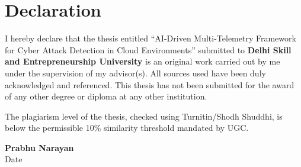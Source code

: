 \chapter*{Declaration}
I hereby declare that the thesis entitled ``AI-Driven Multi-Telemetry Framework for Cyber Attack Detection in Cloud Environments'' submitted to \textbf{Delhi Skill and Entrepreneurship University} is an original work carried out by me under the supervision of my advisor(s). All sources used have been duly acknowledged and referenced. This thesis has not been submitted for the award of any other degree or diploma at any other institution.

The plagiarism level of the thesis, checked using Turnitin/Shodh Shuddhi, is below the permissible 10\% similarity threshold mandated by UGC.

\vspace{1.5cm}
\begin{flushleft}
\textbf{Prabhu Narayan}\\[0.3cm]
Date
\end{flushleft}
\cleardoublepage
